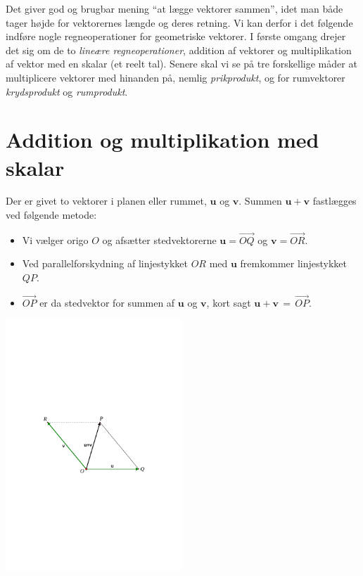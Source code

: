 Det giver god og brugbar mening ``at lægge vektorer sammen'', idet man både tager højde for vektorernes længde og deres retning. Vi kan derfor i det følgende indføre nogle regneoperationer for geometriske vektorer. I første omgang drejer det sig om de to \textit{lineære regneoperationer}, addition af vektorer og multiplikation af vektor med en skalar (et reelt tal). Senere skal vi se på tre forskellige måder at multiplicere vektorer med hinanden på, nemlig \textit{prikprodukt}, og for rumvektorer \textit{krydsprodukt} og \textit{rumprodukt}.
\section{Addition og multiplikation med skalar}
\vspace{-0.5cm}
\begin{definition}[Addition]\label{addition}
Der er givet to vektorer i planen eller rummet, $\mathbf u$ og $\mathbf v$. Summen $\mathbf u +\mathbf v$ fastlægges ved følgende metode:
\vspace{-0.3cm}
\begin{itemize}
\item
Vi vælger origo $O$ og afsætter stedvektorerne $\mathbf{u}=\stackrel{\rightarrow}{OQ}$ og
$\mathbf{v}=\stackrel{\rightarrow}{OR}$.
\item
Ved parallelforskydning af linjestykket $OR$ med $\mathbf u$ fremkommer linjestykket $QP$. 
\item
 $\stackrel{\rightarrow}{OP}$ er da stedvektor for summen af $\mathbf u$ og $\mathbf v$, kort sagt $\mathbf u +  \mathbf v\,=\,\stackrel{\rightarrow}{OP}$.
\end{itemize}
\begin{center}
		\includegraphics[trim=4cm 11.5cm 4cm 11.5cm,width=0.50\textwidth,clip]{geometer/vektor2.pdf}
\end{center}
\end{definition}
